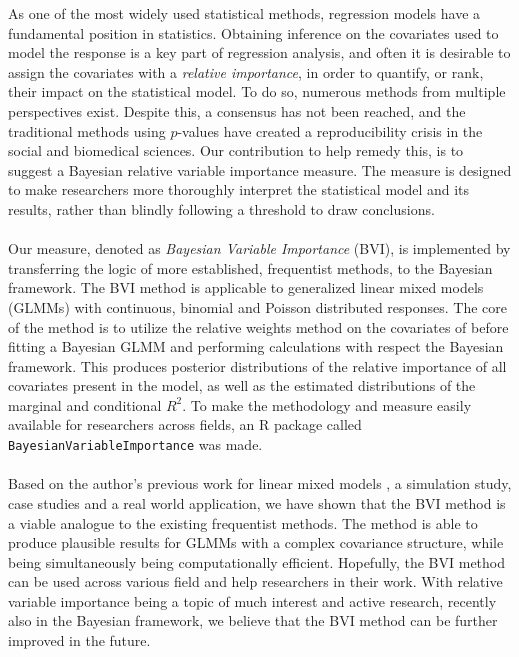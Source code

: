 As one of the most widely used statistical methods, regression models have a fundamental position in statistics. Obtaining inference on the covariates used to model the response is a key part of regression analysis, and often it is desirable to assign the covariates with a \textit{relative importance}, in order to quantify, or rank, their impact on the statistical model. To do so, numerous methods from multiple perspectives exist. Despite this, a consensus has not been reached, and the traditional methods using $p$-values have created a reproducibility crisis in the social and biomedical sciences. Our contribution to help remedy this, is to suggest a Bayesian relative variable importance measure. The measure is designed to make researchers more thoroughly interpret the statistical model and its results, rather than blindly following a threshold to draw conclusions.
\\
\\
Our measure, denoted as \textit{Bayesian Variable Importance} (BVI), is implemented by transferring the logic of more established, frequentist methods, to the Bayesian framework. The BVI method is applicable to generalized linear mixed models (GLMMs) with continuous, binomial and Poisson distributed responses. The core of the method is to utilize the relative weights method on the covariates of before fitting a Bayesian GLMM and performing calculations with respect the Bayesian framework. This produces posterior distributions of the relative importance of all covariates present in the model, as well as the estimated distributions of the marginal and conditional $R^2$. To make the methodology and measure easily available for researchers across fields, an R package called \texttt{BayesianVariableImportance} was made.
\\
\\
Based on the author's previous work for linear mixed models \citep{Arnstad:Relative_variable_importance_in_Bayesian_linear_mixed_models:2024}, a simulation study, case studies and a real world application, we have shown that the BVI method is a viable analogue to the existing frequentist methods. The method is able to produce plausible results for GLMMs with a complex covariance structure, while being simultaneously being computationally efficient. Hopefully, the BVI method can be used across various field and help researchers in their work. With relative variable importance being a topic of much interest and active research, recently also in the Bayesian framework, we believe that the BVI method can be further improved in the future.